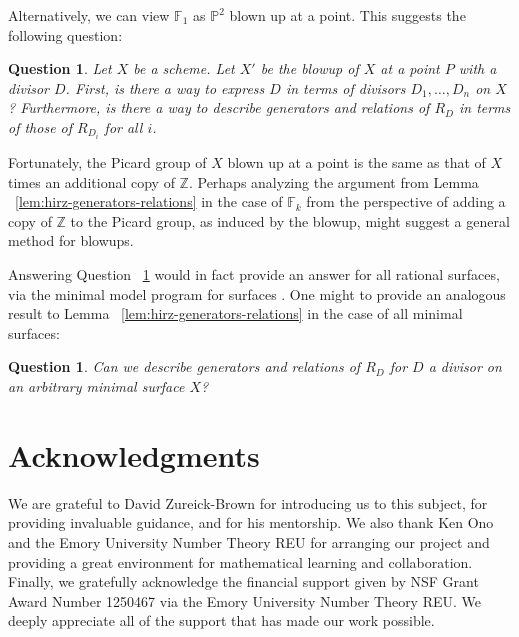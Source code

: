 \documentclass{amsart}
\theoremstyle{plain}
\newtheorem{question}[thm]{Question}
\theoremstyle{definition}
\theoremstyle{remark}
\numberwithin{equation}{section}
\newcommand\bp{{\mathbb P}}
\newcommand\bz{{\mathbb Z}}
\newcommand\hirz{\mathbb{F}}
\begin{document}
Alternatively, we can view $\hirz_1$ as $\bp^2$ blown up at a point.  This suggests the following question:
\begin{question}
\label{qn:general-blowup}
Let $X$ be a scheme.  Let $X'$ be the blowup of $X$ at a point $P$ with a divisor $D$.  First, is there a way to express $D$ in terms of divisors $D_1, \ldots, D_n$ on $X$?  Furthermore, is there a way to describe generators and relations of $R_D$ in terms of those of $R_{D_i}$ for all $i$.
\end{question}

Fortunately, the Picard group of $X$ blown up at a point is the same as that of $X$ times an additional copy of $\bz$.  Perhaps analyzing the argument from Lemma ~\ref{lem:hirz-generators-relations}  in the case of $\hirz_k$ from the perspective of adding a copy of $\mathbb{Z}$ to the Picard group, as induced by the blowup, might suggest a general method for blowups.

Answering Question ~\ref{qn:general-blowup} would in fact provide an answer for all rational surfaces, via the minimal model program for surfaces .  One might to provide an analogous result to Lemma ~\ref{lem:hirz-generators-relations}  in the case of all minimal surfaces:
\begin{question}
\label{qn:general-minimal-surface}
Can we describe generators and relations of $R_D$ for $D$ a divisor on an arbitrary minimal surface $X$?
\end{question}


\section{Acknowledgments}
\label{sec:ack}
We are grateful to David Zureick-Brown for introducing us to this
subject, for providing invaluable guidance,
and for his mentorship. We also thank Ken Ono and the
Emory University Number Theory REU for arranging our project and
providing a great environment for mathematical learning and
collaboration.
Finally, we gratefully acknowledge the financial support given by
NSF Grant Award Number 1250467 via the Emory University Number
Theory REU. We deeply appreciate all of the support that has made
our work possible.


\nocite{*}
{}

\end{document}
